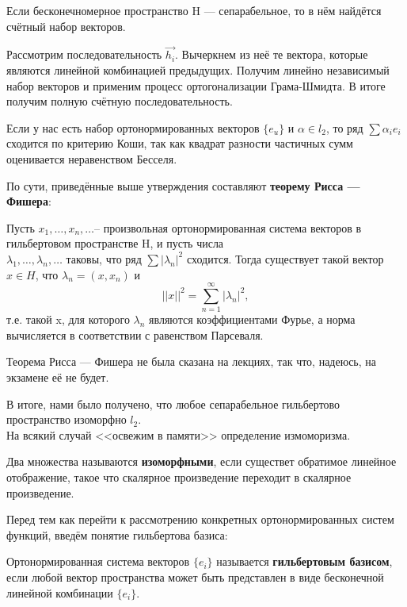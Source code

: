 \documentclass[12pt]{article}
\begin{document}
	Если бесконечномерное пространство H --- сепарабельное, то в нём найдётся счётный набор векторов.
	
	Рассмотрим последовательность $\vec{h_i}$. Вычеркнем из неё те вектора, которые являются линейной комбинацией предыдущих.
	Получим линейно независимый набор векторов и применим процесс ортогонализации Грама-Шмидта. В итоге получим полную счётную 
	последовательность.
	
	Если у нас есть набор ортонормированных векторов $\{ e_u \}$ и $\alpha \in l_2$, то ряд $\sum \alpha_i e_i$ сходится по 
	критерию Коши, так как квадрат разности частичных сумм оценивается неравенством Бесселя.
	
	По сути, приведённые выше утверждения составляют \textbf{теорему Рисса --- Фишера}:
	\begin{theorem}
		Пусть $x_1, \dots ,x_n, \dots $-- произвольная ортонормированная система векторов в гильбертовом пространстве H, и пусть 
		числа \\
		$\lambda _1, \dots ,\lambda _n, \dots $ таковы, что ряд $\sum |\lambda_n|^2$ сходится. Тогда существует такой 
		вектор $x\in H$, что $\lambda _n=(x,x_n)$ и
		\begin{displaymath}
			\vert\vert x\vert\vert ^2=\sum_{n=1}^{\infty } \vert\lambda _n\vert^2,
		\end{displaymath}
		т.е. такой x, для которого $\lambda _n$ являются коэффициентами Фурье, а норма вычисляется в 
		соответствии с равенством Парсеваля. 
	\end{theorem}
	{\color{red} Теорема Рисса --- Фишера не была сказана на лекциях, так что, надеюсь, на экзамене её не будет.}
	
	В итоге, нами было получено, что любое сепарабельное гильбертово пространство изоморфно $l_2$. \\
	На всякий случай <<освежим в памяти>> определение измоморизма.
	\begin{defi}
		Два множества называются \textbf{изоморфными}, если существет обратимое линейное отображение, такое что скалярное
		произведение переходит в скалярное произведение.
	\end{defi}
	
	Перед тем как перейти к рассмотрению конкретных ортонормированных систем функций, введём понятие гильбертова базиса:
	\begin{defi}
		Ортонормированная система векторов $\{ e_i \}$ называется \textbf{гильбертовым базисом}, если любой вектор
		пространства может быть представлен в виде бесконечной линейной комбинации $ \{ e_i \} $.
	\end{defi}
	
\end{document}
